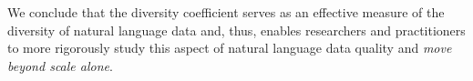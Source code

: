 \begin{enumerate}
\end{enumerate}

We conclude that the diversity coefficient serves as an effective measure of the diversity of natural language data and, thus, enables researchers and practitioners to more rigorously study this aspect of natural language data quality and \textit{move beyond scale alone}. 


